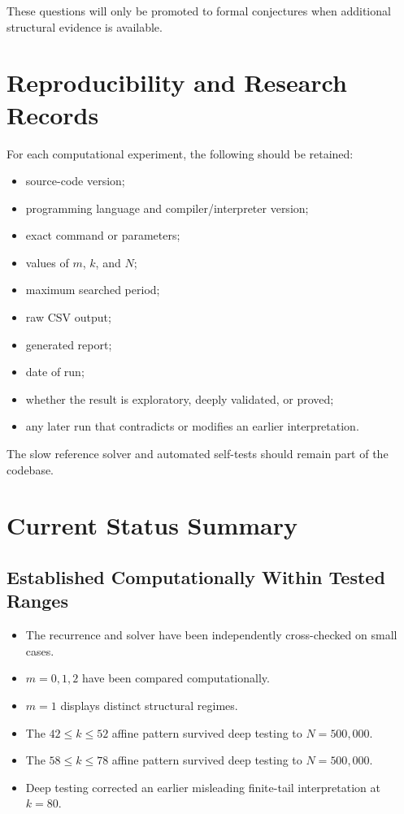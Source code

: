 \documentclass[11pt]{article}
\begin{document}
These questions will only be promoted to formal conjectures when additional structural evidence is available.

\section{Reproducibility and Research Records}

For each computational experiment, the following should be retained:
\begin{itemize}
    \item source-code version;
    \item programming language and compiler/interpreter version;
    \item exact command or parameters;
    \item values of $m$, $k$, and $N$;
    \item maximum searched period;
    \item raw CSV output;
    \item generated report;
    \item date of run;
    \item whether the result is exploratory, deeply validated, or proved;
    \item any later run that contradicts or modifies an earlier interpretation.
\end{itemize}

The slow reference solver and automated self-tests should remain part of the codebase.

\section{Current Status Summary}

\subsection{Established Computationally Within Tested Ranges}
\begin{itemize}
    \item The recurrence and solver have been independently cross-checked on small cases.
    \item $m=0,1,2$ have been compared computationally.
    \item $m=1$ displays distinct structural regimes.
    \item The $42\le k\le52$ affine pattern survived deep testing to $N=500{,}000$.
    \item The $58\le k\le78$ affine pattern survived deep testing to $N=500{,}000$.
    \item Deep testing corrected an earlier misleading finite-tail interpretation at $k=80$.
\end{itemize}
\end{document}
